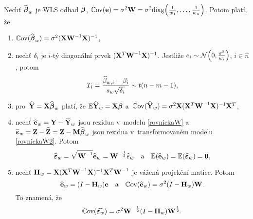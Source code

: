 \begin{theorem}
Nechť $\widehat{\boldsymbol{\beta}}_w$ je WLS odhad $\boldsymbol{\beta}$, $\mathbb{C}\mathrm{ov}(\mathbf{e}) = \sigma^2\textbf{W} = \sigma^2\mathrm{diag}\Big(\frac{1}{w_1},\dots,\frac{1}{w_n}\Big)$. Potom platí, že
\begin{enumerate}[1)]
	\item $\mathbb{C}\mathrm{ov}(\widehat{\boldsymbol{\beta}}_w) = \sigma^2{(\mathbf{X}{\textbf{W}^{-1}}\mathbf{X})^{-1}}$,
	\item nechť $\delta_i$ je $i$-tý diagonální prvek ${(\mathbf{X}^T{\textbf{W}^{-1}}\mathbf{X})^{-1}}$. Jestliže $e_i\sim \mathcal{N}\Big(0,\frac{\sigma^2}{w_i}\Big)$, $i\in\widehat{n}$, potom
	 $$ T_i = \frac{\widehat{\beta}_{w,i}-\beta_i}{s_w\sqrt{\delta_i}}\sim t(n-m-1), $$
	\item pro~$\widehat{\mathbf{Y}} = \mathbf{X}\widehat{\boldsymbol{\beta}}_w$ platí, že $\mathbb{E} \widehat{\mathbf{Y}}_w = \mathbf{X}\boldsymbol{\beta}$ a~$\mathbb{C}\mathrm{ov}(\widehat{\mathbf{Y}}_w) = \sigma^2\mathbf{X}{(\mathbf{X}^T{\textbf{W}^{-1}}\mathbf{X})^{-1}}\mathbf{X}^T$,
\item nechť $\widehat{\mathbf{e}}_w = \mathbf{Y}-\widehat{\mathbf{Y}}_w$ jsou rezidua v~modelu \eqref{rovnickaW} a~$\widehat{\boldsymbol{\varepsilon}}_w = \textbf{Z}-\widehat{\textbf{Z}} = \textbf{Z}-\textbf{M}\widehat{\boldsymbol{\beta}}_w$ jsou rezidua v~transformovaném modelu \eqref{rovnickaW2}. Potom
 $$ \widehat{\boldsymbol{\varepsilon}}_w = \sqrt{{\textbf{W}^{-1}}}\widehat{\mathbf{e}}_w = \textbf{W}^{-\frac{1}{2}}\widehat{e}_w\quad\text{a}\quad \mathbb{E}(\widehat{\mathbf{e}}_w) = \mathbb{E}(\boldsymbol{\widehat{\varepsilon}}_w) = \boldsymbol{0}, $$
\item nechť $\textbf{H}_w = \mathbf{X}{(\mathbf{X}^T{\textbf{W}^{-1}}\mathbf{X})^{-1}}\mathbf{X}^T{\textbf{W}^{-1}}$ je vážená projekční matice. Potom
 $$ \widehat{\mathbf{e}}_w = (I-\textbf{H}_w)\mathbf{e}\quad\text{a}\quad \mathbb{C}\mathrm{ov}(\widehat{\mathbf{e}}_w) = \sigma^2(I-\textbf{H}_w)\textbf{W}. $$
To znamená, že $$ \mathbb{C}\mathrm{ov}(\widehat{\boldsymbol{\varepsilon}_w}) = \sigma^2\textbf{W}^{-\frac{1}{2}}(I-\textbf{H}_w)\textbf{W}^{\frac{1}{2}}. $$
\end{enumerate}


\end{theorem}
